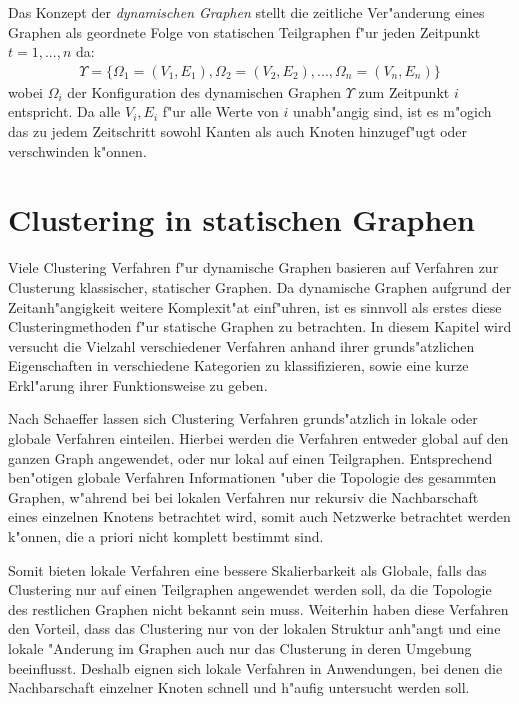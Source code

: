 \documentclass[journal]{vgtc}
\begin{document}
	Das Konzept der \emph{dynamischen Graphen}\cite{modularity} stellt die zeitliche Ver"anderung eines Graphen
	als geordnete Folge von statischen Teilgraphen f"ur jeden Zeitpunkt $t=1,...,n$ da:
	\begin{align}
		\Upsilon=\{\Omega_1=(V_1, E_1), \Omega_2=(V_2, E_2), ..., \Omega_n=(V_n,E_n)\}
	\end{align}
	wobei $\Omega_i$ der Konfiguration des dynamischen Graphen $\Upsilon$ zum Zeitpunkt $i$ entspricht.
	Da alle $V_i, E_i$ f"ur alle Werte von $i$ unabh"angig sind, ist es m"ogich das zu jedem Zeitschritt
	sowohl Kanten als auch Knoten hinzugef"ugt oder verschwinden k"onnen.
  
\section{Clustering in statischen Graphen}
  \label{sec:static_clustering}

  Viele Clustering Verfahren f"ur dynamische Graphen basieren auf Verfahren zur Clusterung klassischer,
  statischer Graphen. Da dynamische Graphen aufgrund der Zeitanh"angigkeit weitere Komplexit"at einf"uhren,
  ist es sinnvoll als erstes diese Clusteringmethoden f"ur statische Graphen zu betrachten.
  In diesem Kapitel wird versucht die Vielzahl verschiedener Verfahren anhand ihrer grunds"atzlichen Eigenschaften
  in verschiedene Kategorien zu klassifizieren, sowie eine kurze Erkl"arung ihrer Funktionsweise zu geben.
  
  Nach Schaeffer \cite{Schaeffer} lassen sich Clustering Verfahren grunds"atzlich in lokale oder globale
  Verfahren einteilen. Hierbei werden die Verfahren entweder global auf den ganzen Graph angewendet,
  oder nur lokal auf einen Teilgraphen. Entsprechend ben"otigen globale Verfahren Informationen "uber 
  die Topologie des gesammten Graphen, w"ahrend bei bei lokalen Verfahren nur rekursiv die Nachbarschaft
  eines einzelnen Knotens betrachtet wird, somit auch Netzwerke betrachtet werden k"onnen, die a priori
  nicht komplett bestimmt sind.
  
  Somit bieten lokale Verfahren eine bessere Skalierbarkeit als Globale, falls das Clustering nur
  auf einen Teilgraphen angewendet werden soll, da die Topologie des restlichen Graphen nicht bekannt sein muss.
  Weiterhin haben diese Verfahren den Vorteil, dass das Clustering nur von der lokalen Struktur anh"angt und eine
  lokale "Anderung im Graphen auch nur das Clusterung in deren Umgebung beeinflusst. Deshalb eignen sich lokale
  Verfahren in Anwendungen, bei denen die Nachbarschaft einzelner Knoten schnell und h"aufig untersucht werden soll.
  
\end{document}
